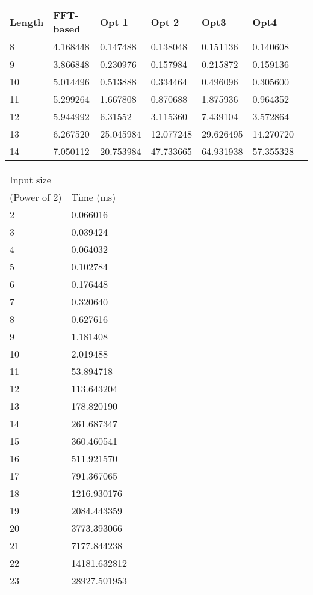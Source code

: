 \documentclass[10pt,a4paper]{article}
\begin{document}
\begin{tabular}{ l || l | l | l | l | l |l |}
\hline
Length & FFT-based & Opt 1 & Opt 2 & Opt3 & Opt4 \\
\hline
8 & 4.168448 & 0.147488 & 0.138048 & 0.151136 & 0.140608 \\
9 & 3.866848 & 0.230976 & 0.157984 & 0.215872 & 0.159136 \\
10 & 5.014496 & 0.513888 & 0.334464 & 0.496096 & 0.305600 \\
11 & 5.299264 & 1.667808 & 0.870688 & 1.875936 & 0.964352 \\
12 & 5.944992 & 6.31552 & 3.115360 & 7.439104 & 3.572864 \\
13 & 6.267520 & 25.045984 & 12.077248 & 29.626495 & 14.270720\\
14 & 7.050112 & 20.753984 & 47.733665 & 64.931938 & 57.355328\\
\hline
\end{tabular}

\begin{tabular}{ l | l }
Input size \\(Power of 2) & Time (ms) \\
\hline
2 & 0.066016 \\
3 & 0.039424 \\
4 & 0.064032 \\
5 & 0.102784 \\
6 & 0.176448 \\
7 & 0.320640 \\
8 & 0.627616 \\
9 & 1.181408 \\
10 & 2.019488 \\
11 & 53.894718 \\
12 & 113.643204 \\
13 & 178.820190 \\
14 & 261.687347 \\
15 & 360.460541 \\
16 & 511.921570 \\
17 & 791.367065 \\
18 & 1216.930176 \\
19 & 2084.443359 \\
20 & 3773.393066 \\
21 & 7177.844238 \\
22 & 14181.632812 \\
23 & 28927.501953 \\
\end{tabular}
\end{document}
